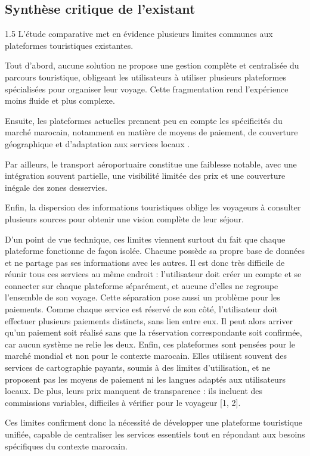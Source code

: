 \documentclass[a4paper,12pt]{report}
\begin{document}
\subsection{Synthèse critique de l'existant}
\vspace{0.5cm}
\begin{spacing}{1.5}
\justifying
L'étude comparative met en évidence plusieurs limites communes aux plateformes touristiques existantes.

Tout d'abord, aucune solution ne propose une gestion complète et centralisée du parcours touristique, obligeant les utilisateurs à utiliser plusieurs plateformes spécialisées pour organiser leur voyage. Cette fragmentation rend l'expérience moins fluide et plus complexe.

Ensuite, les plateformes actuelles prennent peu en compte les spécificités du marché marocain, notamment en matière de moyens de paiement, de couverture géographique et d'adaptation aux services locaux \cite{buhalis2008progress}.

Par ailleurs, le transport aéroportuaire constitue une faiblesse notable, avec une intégration souvent partielle, une visibilité limitée des prix et une couverture inégale des zones desservies.

Enfin, la dispersion des informations touristiques oblige les voyageurs à consulter plusieurs sources pour obtenir une vision complète de leur séjour.

D'un point de vue technique, ces limites viennent surtout du fait que chaque plateforme fonctionne de façon isolée. Chacune possède sa propre base de données et ne partage pas ses informations avec les autres. Il est donc très difficile de réunir tous ces services au même endroit : l'utilisateur doit créer un compte et se connecter sur chaque plateforme séparément, et aucune d'elles ne regroupe l'ensemble de son voyage.
Cette séparation pose aussi un problème pour les paiements. Comme chaque service est réservé de son côté, l'utilisateur doit effectuer plusieurs paiements distincts, sans lien entre eux. Il peut alors arriver qu'un paiement soit réalisé sans que la réservation correspondante soit confirmée, car aucun système ne relie les deux.
Enfin, ces plateformes sont pensées pour le marché mondial et non pour le contexte marocain. Elles utilisent souvent des services de cartographie payants, soumis à des limites d'utilisation, et ne proposent pas les moyens de paiement ni les langues adaptés aux utilisateurs locaux. De plus, leurs prix manquent de transparence : ils incluent des commissions variables, difficiles à vérifier pour le voyageur [1, 2].

Ces limites confirment donc la nécessité de développer une plateforme touristique unifiée, capable de centraliser les services essentiels tout en répondant aux besoins spécifiques du contexte marocain.


\end{spacing}
\end{document}
